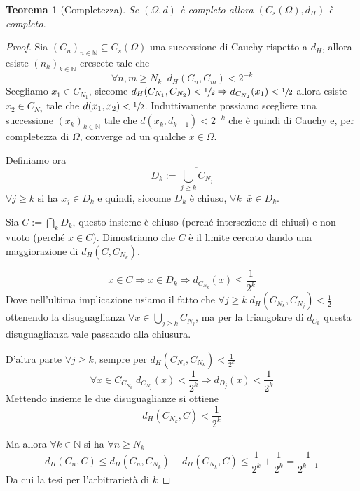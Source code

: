 \documentclass[a4paper,10pt]{article}
\newcounter{counter1}
\theoremstyle{plain}
\newtheorem{myteo}[counter1]{Teorema}
\theoremstyle{definition}
\theoremstyle{remark}
\newcommand{\obar}[1]{\overline{#1}}
\newcommand{\pa}[1]{\left(#1\right)}
\begin{document}
\begin{myteo}[Completezza{\cite[Proposizione 4.4.2]{ambrosio2000selected}}]
  Se $(\Omega,d)$ è completo allora $\pa{C_s(\Omega),d_H}$ è completo.
\end{myteo}
\begin{proof}
  Sia $\pa{C_n}_{n\in \mathbb{N}} \subseteq C_s(\Omega)$ una successione
  di Cauchy rispetto a $d_H$, allora esiste $\pa{n_k}_{k\in
    \mathbb{N}}$ crescete tale che 
  \[ \forall n,m \ge N_k\;\; d_H(C_n,C_m) < 2^{-k} \] Scegliamo
  $x_1\in C_{N_1}$, siccome $d_H(C_{N_1},C_{N_2}) < \sfrac{1}{2}
  \Rightarrow d_{C_{N_2}}(x_1) < \sfrac{1}{2}$ allora esiste $x_2\in
  C_{N_2}$ tale che $d(x_1,x_2) < \sfrac{1}{2}$. Induttivamente
  possiamo scegliere una successione $\pa{x_k}_{k\in \mathbb{N}}$ tale
  che $d(x_k,d_{k+1})<2^{-k}$ che è quindi di Cauchy e, per
  completezza di $\Omega$, converge ad un qualche $\bar x\in \Omega$.

  Definiamo ora 
  \[ D_k:= \obar{ \bigcup_{j \ge k} C_{N_j}} \]
  $\forall j \ge k$ si ha $x_j\in D_k$ e quindi, siccome $D_k$ è
  chiuso, $\forall k\;\; \bar x\in D_k$.

  Sia $C:=\bigcap _k D_k$, questo insieme è chiuso (perché
  intersezione di chiusi) e non vuoto (perché $\bar x\in
  C$). Dimostriamo che $C$ è il limite cercato dando una maggiorazione
  di $d_H(C,C_{N_k})$.

  \[ x\in C \Rightarrow x \in D_k \Rightarrow d_{C_{N_k}}(x) \le
  \frac{1}{2^k} \]
  Dove nell'ultima implicazione usiamo il fatto che $\forall j \ge k
  \; d_H(C_{N_k},C_{N_j}) < \frac{1}{2}$ ottenendo la disuguaglianza
  $\forall x \in \bigcup_{j \ge k} C_{N_j}$, ma per la triangolare di
  $d_{C_k}$ questa disuguaglianza vale passando alla chiusura.
  
  D'altra parte $\forall j\ge k$, sempre per $d_H(C_{N_j},C_{N_k}) <
  \frac{1}{2^k}$
  \[ \forall x \in C_{C_{N_k}}\; d_{C_{N_j}}(x) < \frac{1}{2^k}
  \Rightarrow d_{D_{j}}(x) < \frac{1}{2^k} \]
  Mettendo insieme le due disuguaglianze si ottiene
  \[ d_H(C_{N_k},C) < \frac{1}{2^k} \]
  
  Ma allora $\forall k \in \mathbb{N}$ si ha $\forall n \ge N_k$
  \[ d_H(C_n,C) \le d_H(C_n,C_{N_k}) + d_H(C_{N_k},C) \le
  \frac{1}{2^k} + \frac{1}{2^k} = \frac{1}{2^{k-1}} \]
  Da cui la tesi per l'arbitrarietà di $k$
\end{proof}
\end{document}

